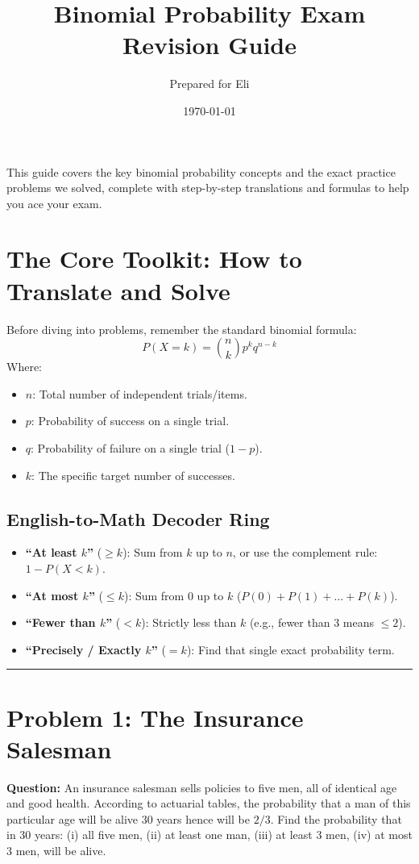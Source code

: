 \documentclass[11pt,a4paper]{article}
\title{\textbf{Binomial Probability Exam Revision Guide}}
\author{Prepared for Eli}
\date{\today}
\begin{document}
\maketitle
\thispagestyle{empty}

\noindent This guide covers the key binomial probability concepts and the exact practice problems we solved, complete with step-by-step translations and formulas to help you ace your exam.

\section*{The Core Toolkit: How to Translate and Solve}
Before diving into problems, remember the standard binomial formula:
$$P(X = k) = \binom{n}{k} p^k q^{n-k}$$
Where:
\begin{itemize}
    \item \textbf{$n$}: Total number of independent trials/items.
    \item \textbf{$p$}: Probability of success on a single trial.
    \item \textbf{$q$}: Probability of failure on a single trial ($1 - p$).
    \item \textbf{$k$}: The specific target number of successes.
\end{itemize}

\subsection*{English-to-Math Decoder Ring}
\begin{itemize}
    \item \textbf{``At least $k$''} ($\ge k$): Sum from $k$ up to $n$, or use the complement rule: $1 - P(X < k)$.
    \item \textbf{``At most $k$''} ($\le k$): Sum from $0$ up to $k$ ($P(0) + P(1) + \dots + P(k)$).
    \item \textbf{``Fewer than $k$''} ($< k$): Strictly less than $k$ (e.g., fewer than 3 means $\le 2$).
    \item \textbf{``Precisely / Exactly $k$''} ($= k$): Find that single exact probability term.
\end{itemize}

\hrule
\vspace{0.5cm}

\section*{Problem 1: The Insurance Salesman}
\textbf{Question:} An insurance salesman sells policies to five men, all of identical age and good health. According to actuarial tables, the probability that a man of this particular age will be alive 30 years hence will be $2/3$. Find the probability that in 30 years: (i) all five men, (ii) at least one man, (iii) at least 3 men, (iv) at most 3 men, will be alive.
\end{document}

